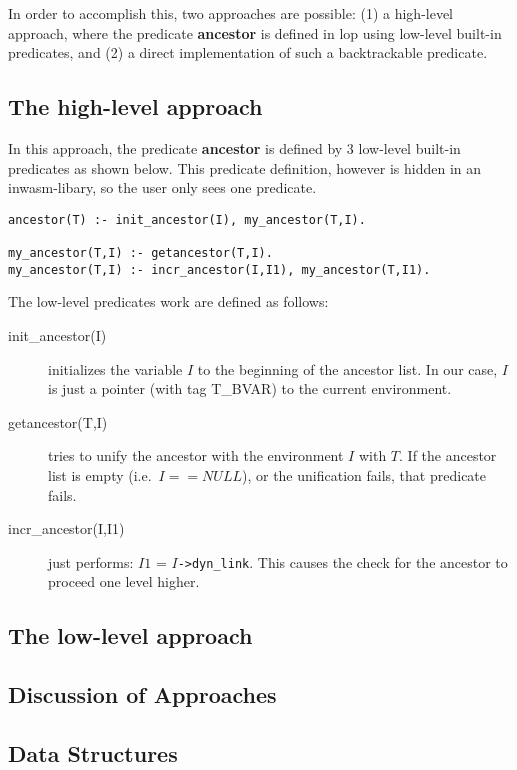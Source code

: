 In order to accomplish this, two approaches are possible:
(1) a high-level approach, where the predicate {\bf ancestor} is
defined in lop using low-level built-in predicates, and (2) a
direct implementation of such a backtrackable predicate.

\subsection{The high-level approach}

In this approach, the predicate {\bf ancestor} is defined by 3
low-level built-in predicates as shown below. This predicate definition,
however is hidden in an inwasm-libary, so the user only sees one
predicate.

\begin{verbatim}
ancestor(T) :- init_ancestor(I), my_ancestor(T,I).

my_ancestor(T,I) :- getancestor(T,I).
my_ancestor(T,I) :- incr_ancestor(I,I1), my_ancestor(T,I1).

\end{verbatim}

The low-level predicates work are defined as follows:

\begin{description}
\item[init\_ancestor(I)] initializes the variable $I$ to the beginning
of the ancestor list. In our case, $I$ is just a pointer
(with tag T\_BVAR) to the current environment.
\item[getancestor(T,I)] tries to unify the ancestor with the environment
$I$ with $T$. If the ancestor list is empty (i.e.\ $I == NULL$), or
the unification fails, that predicate fails.

\item[incr\_ancestor(I,I1)] just performs: $I1$ = $I${\tt ->dyn\_link}.
This causes the check for the ancestor to proceed one level higher.
\end{description}

\subsection{The low-level approach}

\subsection{Discussion of Approaches}


\subsection{Data Structures}

